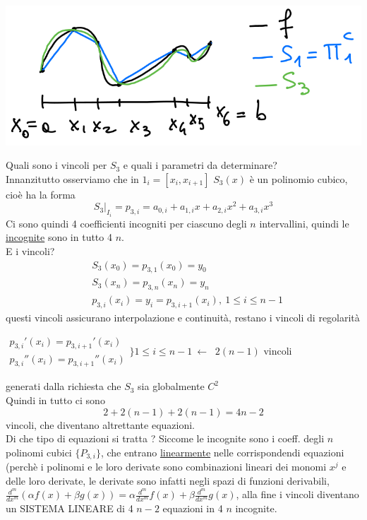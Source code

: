 \documentclass[12pt,a4paper]{article}
\begin{document}
\begin{center}
    \includegraphics[scale=0.4]{img_pag23.png}
\end{center}
Quali sono i vincoli per $S_3$ e quali i parametri da determinare?\\
Innanzitutto osserviamo che in $1_i=[x_i,x_{i+1}]$ $S_3(x)$ è un polinomio cubico, cioè ha la forma 
\begin{equation*}
    S_3 \vert _{I_i} = p_{3,i} = a_{0,i} + a_{1,i}x + a_{2,i}x^2 + a_{3,i}x^3
\end{equation*}
Ci sono quindi 4 coefficienti incogniti per ciascuno degli $n$ intervallini, quindi le \uline{incognite} sono in tutto 4 $n$. \\
E i vincoli?
\begin{align*}
 & S_3(x_0)=p_{3,1}(x_0)=y_0 \\ 
 & S_3(x_n)=p_{3,n}(x_n)=y_n\\ 
 & p_{3,i}(x_i)=y_i=p_{3,i+1}(x_i), \ 1 \leq i \leq n-1 
\end{align*}
questi vincoli assicurano interpolazione e continuità, restano i vincoli di regolarità\\
\begin{center}
$\begin{matrix}
p_{3,i}'(x_i) = p_{3,i+1}'(x_i)\\
p_{3,i}''(x_i) = p_{3,i+1}''(x_i)
\end{matrix}$$\biggl\}1 \leq i \leq n-1 \ \longleftarrow \ $ $2(n-1)$ vincoli 
\end{center}
generati dalla richiesta che $S_3$ sia globalmente $C^2$\\ 
Quindi in tutto ci sono 
\begin{equation*}
    2 + 2(n-1) + 2(n-1) = 4n-2
\end{equation*}
vincoli, che diventano altrettante equazioni.\\
Di che tipo di equazioni si tratta ? Siccome le incognite sono i coeff. degli $n$ polinomi cubici $\{P_{3,i}\}$, che entrano \uline{linearmente} nelle corrispondendi equazioni (perchè i polinomi e le loro derivate sono combinazioni lineari dei monomi $x^j$ e delle loro derivate, le derivate sono infatti negli spazi di funzioni derivabili, $\frac{d^m}{dx^m}(\alpha f(x) + \beta g(x)) = \alpha \frac{d^m}{dx^m} f(x) + \beta \frac{d^m}{dx^m} g(x) $, alla fine i vincoli diventano un SISTEMA LINEARE di 4 $n-2$ equazioni in 4 $n$ incognite. \\
\end{document}
